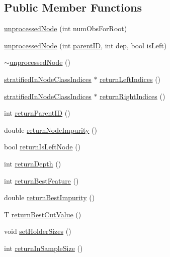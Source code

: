 \subsection*{Public Member Functions}
\begin{DoxyCompactItemize}
\item 
\hyperlink{classfp_1_1unprocessedNode_ae4835a9b488d992f299dbad40c943ae9}{unprocessed\+Node} (int num\+Obs\+For\+Root)
\item 
\hyperlink{classfp_1_1unprocessedNode_ac8c960894806adf6ca652a60f5d11e4a}{unprocessed\+Node} (int \hyperlink{classfp_1_1unprocessedNode_a74cb75f76c24622444e531a583b75c3d}{parent\+ID}, int dep, bool is\+Left)
\item 
\hyperlink{classfp_1_1unprocessedNode_a3242b54f6a1613c61ffa989b92501ab9}{$\sim$unprocessed\+Node} ()
\item 
\hyperlink{classfp_1_1stratifiedInNodeClassIndices}{stratified\+In\+Node\+Class\+Indices} $\ast$ \hyperlink{classfp_1_1unprocessedNode_a8738e5776d4f2da34e328196beea11a5}{return\+Left\+Indices} ()
\item 
\hyperlink{classfp_1_1stratifiedInNodeClassIndices}{stratified\+In\+Node\+Class\+Indices} $\ast$ \hyperlink{classfp_1_1unprocessedNode_a41d3bd481930201d6fc481876fd84175}{return\+Right\+Indices} ()
\item 
int \hyperlink{classfp_1_1unprocessedNode_aba68d6444ff034f7c43acaf3eeda9520}{return\+Parent\+ID} ()
\item 
double \hyperlink{classfp_1_1unprocessedNode_af44e7657d88e4a7bc61b22d97267f940}{return\+Node\+Impurity} ()
\item 
bool \hyperlink{classfp_1_1unprocessedNode_a0c26b122691d15592ce80875bf8920b5}{return\+Is\+Left\+Node} ()
\item 
int \hyperlink{classfp_1_1unprocessedNode_ac1b4cb820f5c29832f9a7ea7bf896139}{return\+Depth} ()
\item 
int \hyperlink{classfp_1_1unprocessedNode_a32e9c381659db64022fa0491de48f70c}{return\+Best\+Feature} ()
\item 
double \hyperlink{classfp_1_1unprocessedNode_a1b147714de502bcff5c727d2ce9144f8}{return\+Best\+Impurity} ()
\item 
T \hyperlink{classfp_1_1unprocessedNode_ace7db1655a4f21d4d39c989ff1db806b}{return\+Best\+Cut\+Value} ()
\item 
void \hyperlink{classfp_1_1unprocessedNode_ae1aa4f8f868fe19c8e48d3fe1e5596a8}{set\+Holder\+Sizes} ()
\item 
int \hyperlink{classfp_1_1unprocessedNode_a5243ac02610f01c6b0df9d5fd6f6f857}{return\+In\+Sample\+Size} ()

\end{DoxyCompactItemize}
